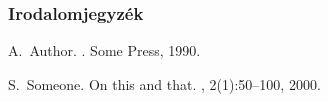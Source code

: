\documentclass{beamer}
\begin{document}
\begin{frame}[allowframebreaks]
  \frametitle<presentation>{Irodalomjegyzék}
    
  \begin{thebibliography}{10}
    
  \beamertemplatebookbibitems

    A.~Author.
    .
    \newblock Some Press, 1990.
 
    
  \beamertemplatearticlebibitems

    S.~Someone.
    \newblock On this and that.
    , 2(1):50--100,
    2000.
  \end{thebibliography}
\end{frame}
\end{document}
